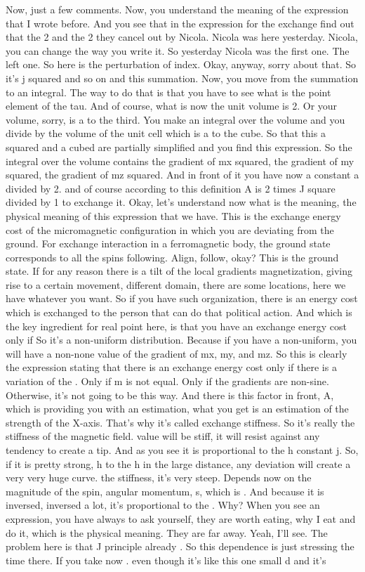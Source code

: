 Now, just a few comments. Now, you understand the meaning of the expression that I wrote before. And you see that in the expression for the exchange find out that the 2 and the 2 they cancel out by Nicola. Nicola was here yesterday. Nicola, you can change the way you write it. So yesterday Nicola was the first one. The left one. So here is the perturbation of index. Okay, anyway, sorry about that. So it's j squared and so on and this summation. Now, you move from the summation to an integral. The way to do that is that you have to see what is the point element of the tau. And of course, what is now the unit volume is 2. Or your volume, sorry, is a to the third. You make an integral over the volume and you divide by the volume of the unit cell which is a to the cube. So that this a squared and a cubed are partially simplified and you find this expression. So the integral over the volume contains the gradient of mx squared, the gradient of my squared, the gradient of mz squared. And in front of it you have now a constant a divided by 2. and of course according to this definition A is 2 times J square divided by 1 to exchange it. Okay, let's understand now what is the meaning, the physical meaning of this expression that we have. This is the exchange energy cost of the micromagnetic configuration in which you are deviating from the ground. For exchange interaction in a ferromagnetic body, the ground state corresponds to all the spins following. Align, follow, okay? This is the ground state. If for any reason there is a tilt of the local gradients magnetization, giving rise to a certain movement, different domain, there are some locations, here we have whatever you want. So if you have such organization, there is an energy cost which is exchanged to the person that can do that political action. And which is the key ingredient for real point here, is that you have an exchange energy cost only if So it's a non-uniform distribution. Because if you have a non-uniform, you will have a non-none value of the gradient of mx, my, and mz. So this is clearly the expression stating that there is an exchange energy cost only if there is a variation of the . Only if m is not equal. Only if the gradients are non-sine. Otherwise, it's not going to be this way. And there is this factor in front, A, which is providing you with an estimation, what you get is an estimation of the strength of the X-axis. That's why it's called exchange stiffness. So it's really the stiffness of the magnetic field. value will be stiff, it will resist against any tendency to create a tip. And as you see it is proportional to the h constant j. So, if it is pretty strong, h to the h in the large distance, any deviation will create a very very huge curve. the stiffness, it's very steep. Depends now on the magnitude of the spin, angular momentum, s, which is . And because it is inversed, inversed a lot, it's proportional to the . Why? When you see an expression, you have always to ask yourself, they are worth eating, why I eat and do it, which is the physical meaning. They are far away. Yeah, I'll see. The problem here is that J principle already . So this dependence is just stressing the time there. If you take now . even though it's like this one small d and it's 